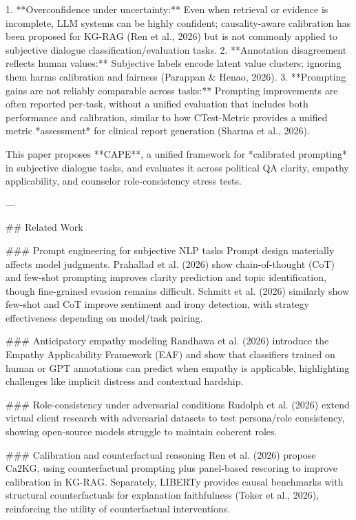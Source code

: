 1. **Overconfidence under uncertainty:** Even when retrieval or evidence is incomplete, LLM systems can be highly confident; causality-aware calibration has been proposed for KG-RAG (Ren et al., 2026) but is not commonly applied to subjective dialogue classification/evaluation tasks.  
2. **Annotation disagreement reflects human values:** Subjective labels encode latent value clusters; ignoring them harms calibration and fairness (Parappan & Henao, 2026).  
3. **Prompting gains are not reliably comparable across tasks:** Prompting improvements are often reported per-task, without a unified evaluation that includes both performance and calibration, similar to how CTest-Metric provides a unified metric *assessment* for clinical report generation (Sharma et al., 2026).

This paper proposes **CAPE**, a unified framework for *calibrated prompting* in subjective dialogue tasks, and evaluates it across political QA clarity, empathy applicability, and counselor role-consistency stress tests.

---

## Related Work  

### Prompt engineering for subjective NLP tasks  
Prompt design materially affects model judgments. Prahallad et al. (2026) show chain-of-thought (CoT) and few-shot prompting improves clarity prediction and topic identification, though fine-grained evasion remains difficult. Schmitt et al. (2026) similarly show few-shot and CoT improve sentiment and irony detection, with strategy effectiveness depending on model/task pairing.

### Anticipatory empathy modeling  
Randhawa et al. (2026) introduce the Empathy Applicability Framework (EAF) and show that classifiers trained on human or GPT annotations can predict when empathy is applicable, highlighting challenges like implicit distress and contextual hardship.

### Role-consistency under adversarial conditions  
Rudolph et al. (2026) extend virtual client research with adversarial datasets to test persona/role consistency, showing open-source models struggle to maintain coherent roles.

### Calibration and counterfactual reasoning  
Ren et al. (2026) propose Ca2KG, using counterfactual prompting plus panel-based rescoring to improve calibration in KG-RAG. Separately, LIBERTy provides causal benchmarks with structural counterfactuals for explanation faithfulness (Toker et al., 2026), reinforcing the utility of counterfactual interventions.

